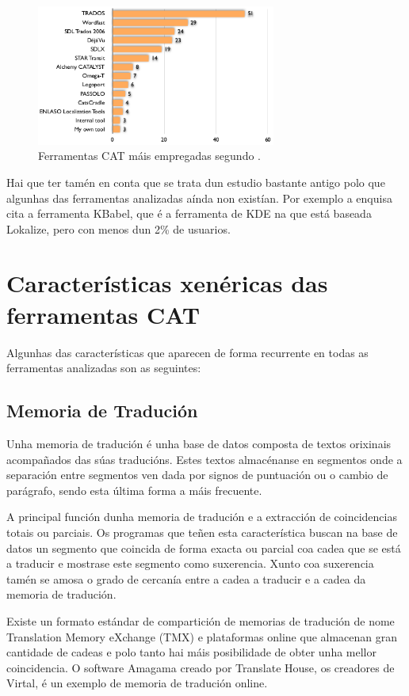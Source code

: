 \begin{figure}[h]
    \centering
    \includegraphics[width=0.7\textwidth]{img/grafico_uso_cat_enquisa2006.png}
    \caption{Ferramentas CAT máis empregadas segundo \cite{article:2006survey}.}
    \label{fig:enquisa2006}
\end{figure}

Hai que ter tamén en conta que se trata dun estudio bastante antigo polo que algunhas das ferramentas analizadas aínda non existían. Por exemplo a enquisa cita a ferramenta KBabel, que é a ferramenta de KDE na que está baseada Lokalize, pero con menos dun 2\% de usuarios.


\section{Características xenéricas das ferramentas CAT}

Algunhas das características que aparecen de forma recurrente en todas as ferramentas analizadas son as seguintes:

\subsection{Memoria de Tradución}
Unha memoria de tradución é unha base de datos composta de textos orixinais acompañados das súas traducións. Estes textos almacénanse en segmentos onde a separación entre segmentos ven dada por signos de puntuación ou o cambio de parágrafo, sendo esta última forma a máis frecuente.

A principal función dunha memoria de tradución e a extracción de coincidencias totais ou parciais. Os programas que teñen esta característica buscan na base de datos un segmento que coincida de forma exacta ou parcial coa cadea que se está a traducir e mostrase este segmento como suxerencia. Xunto coa suxerencia tamén se amosa o grado de cercanía entre a cadea a traducir e a cadea da memoria de tradución.

Existe un formato estándar de compartición de memorias de tradución de nome Translation Memory eXchange (TMX) e plataformas online que almacenan gran cantidade de cadeas e polo tanto hai máis posibilidade de obter unha mellor coincidencia. O software Amagama creado por Translate House, os creadores de Virtal, é un exemplo de memoria de tradución online.

